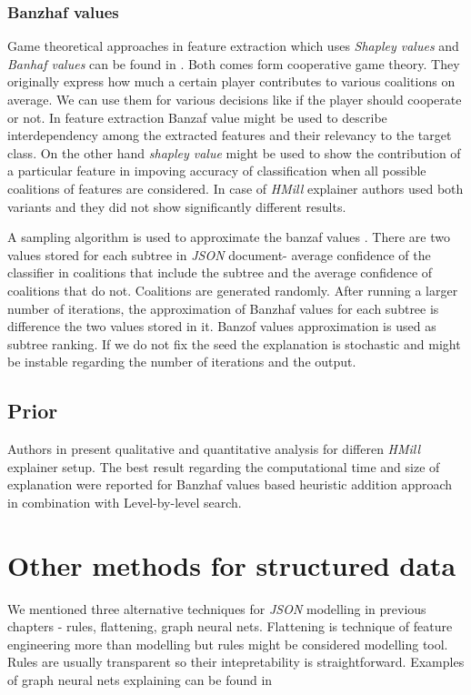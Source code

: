 \subsubsection{Banzhaf values}
Game theoretical approaches in feature extraction which uses \emph{Shapley values} and \emph{Banhaf values} can be found in \cite{Afghah2018}. Both comes form cooperative game theory. They originally express how much a certain player contributes to various coalitions on average. We can use them for various decisions like if the player should cooperate or not. In feature extraction Banzaf value might be used to describe interdependency among the extracted features and their relevancy to the target class. On the other hand \emph{shapley value} might be used to show the contribution of a particular feature in impoving accuracy of classification when all possible coalitions of features are considered. In case of \emph{HMill} explainer authors used both variants and they did not show significantly different results. 

A sampling algorithm is used to approximate the banzaf values \cite{Bachrach2010}. There are two values stored for each subtree in \emph{JSON} document- average confidence of the classifier in coalitions that include the subtree and the average confidence of coalitions that do not. Coalitions are generated randomly. After running a larger number of iterations, the approximation of Banzhaf values for each subtree is difference the two values stored in it. Banzof values approximation is used as subtree ranking. If we do not fix the seed the explanation is stochastic and might be instable regarding the number of iterations and the output.


\subsection{Prior}
Authors in \cite{Pevny2020} present qualitative and quantitative analysis for differen \emph{HMill} explainer setup. The best result regarding the computational time and size of explanation were reported for Banzhaf values based heuristic addition approach in combination with Level-by-level search.


\section{Other methods for structured data}
We mentioned three alternative techniques for \emph{JSON} modelling in previous chapters - rules, flattening, graph neural nets. Flattening is technique of feature engineering more than modelling but rules might be considered modelling tool. Rules are usually transparent so their intepretability is straightforward. Examples of graph neural nets explaining can be found in \cite{Ying2019, Huang2020} 

